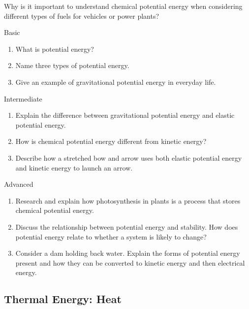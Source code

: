 \begin{stopandthink}
Why is it important to understand chemical potential energy when considering different types of fuels for vehicles or power plants?
\end{stopandthink}


\begin{tieredquestions}{Basic}
\begin{enumerate}
    \item What is potential energy?
    \item Name three types of potential energy.
    \item Give an example of gravitational potential energy in everyday life.
\end{enumerate}
\end{tieredquestions}

\begin{tieredquestions}{Intermediate}
\begin{enumerate}
    \item Explain the difference between gravitational potential energy and elastic potential energy.
    \item How is chemical potential energy different from kinetic energy?
    \item Describe how a stretched bow and arrow uses both elastic potential energy and kinetic energy to launch an arrow.
\end{enumerate}
\end{tieredquestions}

\begin{tieredquestions}{Advanced}
\begin{enumerate}
    \item Research and explain how photosynthesis in plants is a process that stores chemical potential energy.
    \item Discuss the relationship between potential energy and stability.  How does potential energy relate to whether a system is likely to change?
    \item Consider a dam holding back water. Explain the forms of potential energy present and how they can be converted to kinetic energy and then electrical energy.
\end{enumerate}
\end{tieredquestions}


\subsection{Thermal Energy: Heat}

